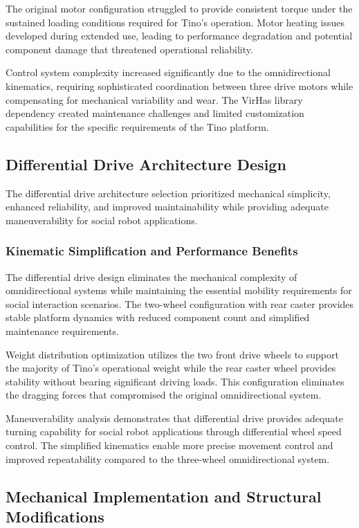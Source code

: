 The original motor configuration struggled to provide consistent torque under the sustained loading conditions required for Tino's operation. Motor heating issues developed during extended use, leading to performance degradation and potential component damage that threatened operational reliability.

Control system complexity increased significantly due to the omnidirectional kinematics, requiring sophisticated coordination between three drive motors while compensating for mechanical variability and wear. The VirHas library dependency created maintenance challenges and limited customization capabilities for the specific requirements of the Tino platform.

\subsection{Differential Drive Architecture Design}

The differential drive architecture selection prioritized mechanical simplicity, enhanced reliability, and improved maintainability while providing adequate maneuverability for social robot applications.

\subsubsection{Kinematic Simplification and Performance Benefits}

The differential drive design eliminates the mechanical complexity of omnidirectional systems while maintaining the essential mobility requirements for social interaction scenarios. The two-wheel configuration with rear caster provides stable platform dynamics with reduced component count and simplified maintenance requirements.

Weight distribution optimization utilizes the two front drive wheels to support the majority of Tino's operational weight while the rear caster wheel provides stability without bearing significant driving loads. This configuration eliminates the dragging forces that compromised the original omnidirectional system.

Maneuverability analysis demonstrates that differential drive provides adequate turning capability for social robot applications through differential wheel speed control. The simplified kinematics enable more precise movement control and improved repeatability compared to the three-wheel omnidirectional system.

\subsection{Mechanical Implementation and Structural Modifications}

